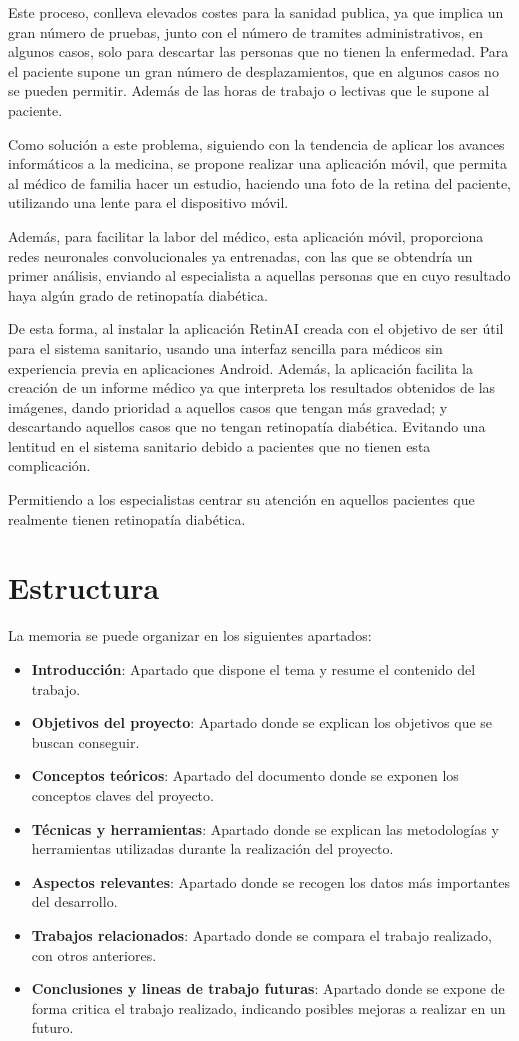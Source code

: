 Este proceso, conlleva elevados costes para la sanidad publica, ya que implica un gran número de pruebas, junto con el número de tramites administrativos, en algunos casos, solo para descartar las personas que no tienen la enfermedad. Para el paciente supone un gran número de desplazamientos, que en algunos casos no se pueden permitir. Además de las horas de trabajo o lectivas que le supone al paciente.

Como solución a este problema, siguiendo con la tendencia de aplicar los avances informáticos a la medicina,  se propone realizar una aplicación móvil, que permita al médico de familia hacer un estudio, haciendo una foto de la retina del paciente, utilizando una lente para el dispositivo móvil. 

Además, para facilitar la labor del médico, esta aplicación móvil, proporciona redes neuronales convolucionales ya entrenadas, con las que se obtendría un primer análisis, enviando al especialista a aquellas personas que en cuyo resultado haya algún grado de retinopatía diabética. 

De esta forma, al instalar la aplicación RetinAI creada con el objetivo de ser útil para el sistema sanitario, usando una interfaz sencilla para médicos sin experiencia previa en aplicaciones Android. Además, la aplicación facilita la creación de un informe médico ya que interpreta los resultados obtenidos de las imágenes, dando prioridad a aquellos casos que tengan más gravedad; y descartando aquellos casos que no tengan retinopatía diabética. Evitando una lentitud en el sistema sanitario debido a pacientes que no tienen esta complicación. 

Permitiendo a los especialistas centrar su atención en aquellos pacientes que realmente tienen retinopatía diabética.

\section{Estructura}
La memoria se puede organizar en los siguientes apartados:
\begin{itemize}
    \item \textbf{Introducción}: Apartado que dispone el tema y resume el contenido del trabajo.
    \item \textbf{Objetivos del proyecto}: Apartado donde se explican los objetivos que se buscan conseguir.
    \item \textbf{Conceptos teóricos}: Apartado del documento donde se exponen los conceptos claves del proyecto.
    \item \textbf{Técnicas y herramientas}: Apartado donde se explican las metodologías y herramientas utilizadas durante la realización del proyecto.
    \item \textbf{Aspectos relevantes}: Apartado donde se recogen los datos más importantes del desarrollo.
    \item \textbf{Trabajos relacionados}: Apartado donde se compara el trabajo realizado, con otros anteriores.
    \item \textbf{Conclusiones y lineas de trabajo futuras}: Apartado donde se expone de forma critica el trabajo realizado, indicando posibles mejoras a realizar en un futuro.
\end{itemize}

